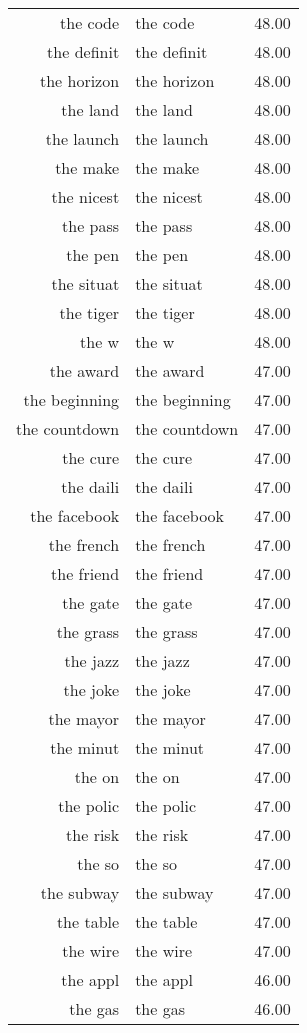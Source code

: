 \begin{table}[ht]
\begin{tabular}{rlr}
  the code & the code & 48.00 \\ 
  the definit & the definit & 48.00 \\ 
  the horizon & the horizon & 48.00 \\ 
  the land & the land & 48.00 \\ 
  the launch & the launch & 48.00 \\ 
  the make & the make & 48.00 \\ 
  the nicest & the nicest & 48.00 \\ 
  the pass & the pass & 48.00 \\ 
  the pen & the pen & 48.00 \\ 
  the situat & the situat & 48.00 \\ 
  the tiger & the tiger & 48.00 \\ 
  the w & the w & 48.00 \\ 
  the award & the award & 47.00 \\ 
  the beginning & the beginning & 47.00 \\ 
  the countdown & the countdown & 47.00 \\ 
  the cure & the cure & 47.00 \\ 
  the daili & the daili & 47.00 \\ 
  the facebook & the facebook & 47.00 \\ 
  the french & the french & 47.00 \\ 
  the friend & the friend & 47.00 \\ 
  the gate & the gate & 47.00 \\ 
  the grass & the grass & 47.00 \\ 
  the jazz & the jazz & 47.00 \\ 
  the joke & the joke & 47.00 \\ 
  the mayor & the mayor & 47.00 \\ 
  the minut & the minut & 47.00 \\ 
  the on & the on & 47.00 \\ 
  the polic & the polic & 47.00 \\ 
  the risk & the risk & 47.00 \\ 
  the so & the so & 47.00 \\ 
  the subway & the subway & 47.00 \\ 
  the table & the table & 47.00 \\ 
  the wire & the wire & 47.00 \\ 
  the appl & the appl & 46.00 \\ 
  the gas & the gas & 46.00 \\ 

\end{tabular}
\end{table}
